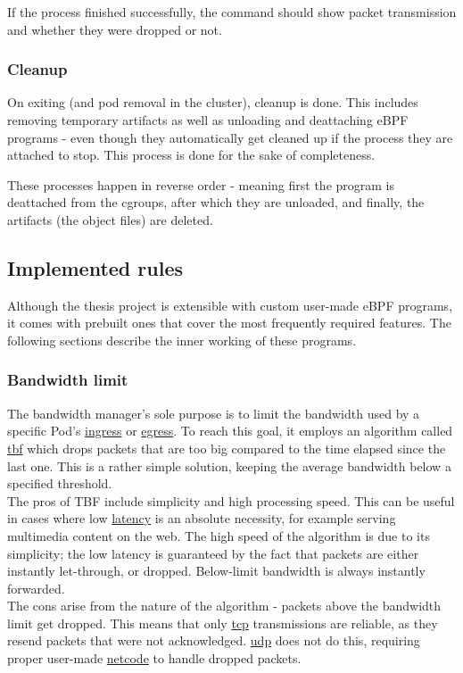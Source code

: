 If the process finished successfully, the command should show packet transmission and whether they were dropped or not.

\subsubsection{Cleanup}
On exiting (and pod removal in the cluster), cleanup is done. This includes removing temporary artifacts as well as unloading and deattaching eBPF programs - even though they automatically get cleaned up if the process they are attached to stop. This process is done for the sake of completeness.

These processes happen in reverse order - meaning first the program is deattached from the cgroups, after which they are unloaded, and finally, the artifacts (the object files) are deleted.

\newpage
\subsection{Implemented rules}
Although the thesis project is extensible with custom user-made eBPF programs, it comes with prebuilt ones that cover the most frequently required features. The following sections describe the inner working of these programs.

\subsubsection{Bandwidth limit}
The bandwidth manager's sole purpose is to limit the bandwidth used by a specific Pod's \underline{\gls{ingress}} or \underline{\gls{egress}}. To reach this goal, it employs an algorithm called \underline{\gls{tbf}} which drops packets that are too big compared to the time elapsed since the last one. This is a rather simple solution, keeping the average bandwidth below a specified threshold. \\

The pros of TBF include simplicity and high processing speed. This can be useful in cases where low \underline{\gls{latency}} is an absolute necessity, for example serving multimedia content on the web. The high speed of the algorithm is due to its simplicity; the low latency is guaranteed by the fact that packets are either instantly let-through, or dropped. Below-limit bandwidth is always instantly forwarded. \\

The cons arise from the nature of the algorithm - packets above the bandwidth limit get dropped. This means that only \underline{\gls{tcp}} transmissions are reliable, as they resend packets that were not acknowledged. \underline{\gls{udp}} does not do this, requiring proper user-made \underline{\gls{netcode}} to handle dropped packets. \\

